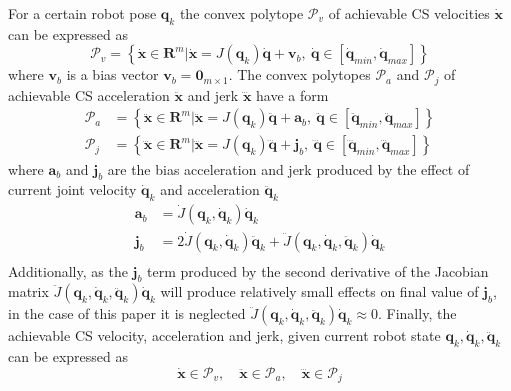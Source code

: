 For a certain robot pose $\bm{q}_k$ the convex polytope $\mathcal{P}_v$ of achievable CS velocities $\dot{\bm{x}}$ can be expressed as
\begin{equation}
    \mathcal{P}_v = \left\{ \dot{\bm{x}}\in\mathbf{R}^m | \dot{\bm{x}}=J(\bm{q}_k)\dot{\bm{q}}\! +\! \bm{v}_b, ~ \dot{\bm{q}}\in \left[\dot{\bm{q}}_{min}, \dot{\bm{q}}_{max} \right] \right\}
    \label{eq:vel_poly}
\end{equation}
where $\bm{v}_b$ is a bias vector $\bm{v}_b\!=\!\bm{0}_{m\times 1}$. The convex polytopes $\mathcal{P}_a$ and $\mathcal{P}_j$ of achievable CS acceleration $\ddot{\bm{x}}$ and jerk $\dddot{\bm{x}}$ have a form
\begin{equation}
\begin{split}
    \mathcal{P}_a \!&=\! \left\{ \ddot{\bm{x}}\in\mathbf{R}^m | \ddot{\bm{x}}=J(\bm{q}_k)\ddot{\bm{q}}\! +\! \bm{a}_b, ~ \ddot{\bm{q}}\in \left[\ddot{\bm{q}}_{min}, \ddot{\bm{q}}_{max} \right] \right\}\\
    \mathcal{P}_j\!&=\! \left\{ \dddot{\bm{x}}\!\in\mathbf{R}^m | \dddot{\bm{x}}\!=\!J(\bm{q}_k)\dddot{\bm{q}}\! \!+\!\bm{j}_b, ~ \!\dddot{\bm{q\!}}\!\in \left[\!\dddot{\bm{q\!}}_{min}, \dddot{\bm{q\!}}_{max} \right] \right\}
\end{split}\label{eq:jerk_acc_poly}
\end{equation}
where $\bm{a}_b$ and $\bm{j}_b$ are the bias acceleration and jerk produced by the effect of current joint velocity $\dot{\bm{q}}_k$ and acceleration $\ddot{\bm{q}}_k$ 
\begin{equation}
\begin{split}
\bm{a}_b&= \dot{J}(\bm{q}_k,\dot{\bm{q}}_k)\dot{\bm{q}}_k\\
\bm{j}_b&= 2\dot{J}(\bm{q}_k,\dot{\bm{q}}_k)\ddot{\bm{q}}_k + \ddot{J}(\bm{q}_k,\dot{\bm{q}}_k,\ddot{\bm{q}}_k)\dot{\bm{q}}_k\\
 \end{split} \label{eq:bias_terms}
\end{equation}
Additionally, as the $\bm{j}_b$ term produced by the second derivative of the Jacobian matrix $\ddot{J}(\bm{q}_k,\dot{\bm{q}}_k,\ddot{\bm{q}}_k)\dot{\bm{q}}_k$ will produce relatively small effects on final value of $\bm{j}_b$, in the case of this paper it is neglected $\ddot{J}(\bm{q}_k,\dot{\bm{q}}_k,\ddot{\bm{q}}_k)\dot{\bm{q}}_k \approx 0$. Finally, the achievable CS velocity, acceleration and jerk, given current robot state $\bm{q}_k,\dot{\bm{q}}_k,\ddot{\bm{q}}_k$ can be expressed as
\begin{equation}
    \dot{\bm{x}}\in \mathcal{P}_v, \quad \ddot{\bm{x}}\in \mathcal{P}_a, \quad \dddot{\bm{x}}\in \mathcal{P}_j\label{eq:limits_poly}
\end{equation}

